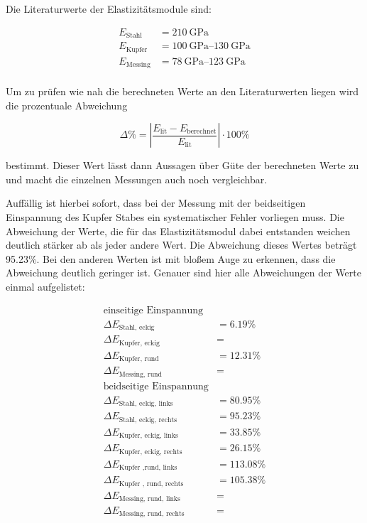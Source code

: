\noindent Die Literaturwerte \cite{E-Modul} der Elastizitätsmodule sind: 

\begin{align*}
    E_\text{Stahl} &= \SI{210}{\giga\pascal} \\
    E_\text{Kupfer} &= \SIrange[range-units=brackets, range-phrase=-]{100}{130}{\giga\pascal} \\
    E_\text{Messing} &= \SIrange[range-units=brackets, range-phrase=-]{78}{123}{\giga\pascal} \\
\end{align*}

\noindent Um zu prüfen wie nah die berechneten Werte an den Literaturwerten liegen wird die prozentuale Abweichung 

\begin{equation*}
    \Delta \% = \left\lvert\frac{E_\text{lit}-E_\text{berechnet}}{E_\text{lit}}\right\rvert \cdot 100\%
\end{equation*}

\noindent bestimmt. Dieser Wert lässt dann Aussagen über Güte der berechneten Werte zu und macht die einzelnen Messungen auch noch vergleichbar.

\noindent Auffällig ist hierbei sofort, dass bei der Messung mit der beidseitigen Einspannung des Kupfer Stabes ein systematischer Fehler vorliegen muss. Die Abweichung der Werte, die für das Elastizitätsmodul dabei entstanden weichen deutlich stärker ab als jeder andere Wert. Die Abweichung dieses Wertes beträgt 95.23\%. Bei den anderen Werten ist mit bloßem Auge zu erkennen, dass die Abweichung deutlich geringer ist. Genauer sind hier alle Abweichungen der Werte einmal aufgelistet:

\begin{align*}
    \text{einseitige Einspannung}\\
    \Delta E_\text{Stahl, eckig} &= 6.19\% \\
    \Delta E_\text{Kupfer, eckig} &=  \\
    \Delta E_\text{Kupfer, rund} &= 12.31\% \\
    \Delta E_\text{Messing, rund} &=  \\
    \text{beidseitige Einspannung} \\
    \Delta E_\text{Stahl, eckig, links} &= 80.95\% \\
    \Delta E_\text{Stahl, eckig, rechts} &= 95.23\%\\
    \Delta E_\text{Kupfer, eckig, links} &= 33.85\%\\
    \Delta E_\text{Kupfer, eckig, rechts} &= 26.15\%\\
    \Delta E_\text{Kupfer ,rund, links} &= 113.08\%\\
    \Delta E_\text{Kupfer , rund, rechts} &= 105.38\%\\
    \Delta E_\text{Messing, rund, links} &= \\
    \Delta E_\text{Messing, rund, rechts} &= \\
\end{align*}

